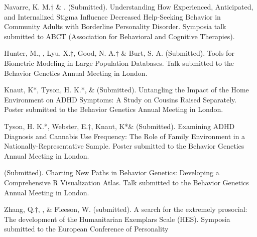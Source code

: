 \item Navarre, K. M.$\dagger$ \& \meb. (Submitted). Understanding How Experienced, Anticipated, and Internalized Stigma Influence Decreased Help-Seeking Behavior in Community Adults with Borderline Personality Disorder. Symposia talk submitted to ABCT (Association for Behavioral and Cognitive Therapies).

\item Hunter, M., \meb, Lyu, X.$\dagger$, Good, N. A.$\dagger$ \& Burt, S. A. (Submitted). Tools for Biometric Modeling in Large Population Databases. Talk submitted to the Behavior Genetics Annual Meeting in London.
\item Knaut, K*, Tyson, H. K.*, \& \meb (Submitted). Untangling the Impact of the Home Environment on ADHD Symptoms: A Study on Cousins Raised Separately. Poster submitted to the Behavior Genetics Annual Meeting in London.
\item Tyson, H. K.*, Webster, E.$\dagger$, Knaut, K*\& \meb (Submitted). Examining ADHD Diagnosis and Cannabis Use Frequency: The Role of Family Environment in a Nationally-Representative Sample. Poster submitted to the Behavior Genetics Annual Meeting in London.
\item \meb (Submitted). Charting New Paths in Behavior Genetics: Developing a Comprehensive R Visualization Atlas. Talk submitted to the Behavior Genetics Annual Meeting in London.

\item Zhang, Q.$\dagger$, \meb, \&  Fleeson, W. (submitted). A search for the extremely prosocial: The development of the Humanitarian Exemplars Scale (HES). Symposia submitted to the European Conference of Personality %







%

%

%
